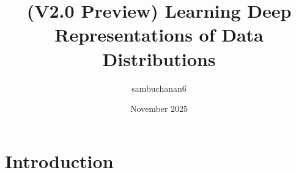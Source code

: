 \documentclass{article}
\title{(V2.0 Preview) Learning Deep Representations of Data Distributions}
\author{sambuchanan6 }
\date{November 2025}
\begin{document}
\maketitle

\section{Introduction}
\end{document}

